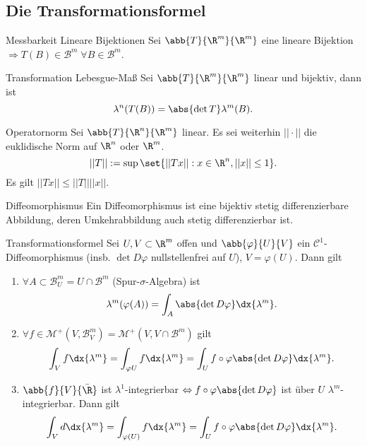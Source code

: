 \subsection*{Die Transformationsformel}

\begin{karte}{Messbarkeit Lineare Bijektionen}
    Sei \( \abb{T}{\R^m}{\R^m} \) eine lineare Bijektion 
    \( \Rightarrow T(B) \in \mathcal{B}^m \;\forall B\in \mathcal{B}^m \).
\end{karte}

\begin{karte}{Transformation Lebesgue-Maß}
    Sei \( \abb{T}{\R^m}{\R^m} \) linear und bijektiv, 
    dann ist 
    \[ \lambda^n(T(B)) = \abs{\det T} \lambda^m(B). \]
\end{karte}

\begin{karte}{Operatornorm}
    Sei \( \abb{T}{\R^n}{\R^m} \) linear. Es sei weiterhin 
    \( ||\cdot|| \) die euklidische Norm auf \(\R^n \) oder \(\R^m\). 
    \[ ||T|| := \sup\set{||Tx||:x\in \R^n, ||x||\leq 1}. \]
    Es gilt 
    \( ||Tx|| \leq ||T|| ||x|| \).
\end{karte}

\begin{karte}{Diffeomorphismus}
    Ein Diffeomorphismus ist eine bijektiv stetig differenzierbare Abbildung, 
    deren Umkehrabbildung auch stetig differenzierbar ist.
\end{karte}

\begin{karte}{Transformationsformel}
    Sei \( U,V\subset \R^m \) offen und \( \abb{\varphi}{U}{V} \) 
    ein \( \mathcal{C}^1 \)-Diffeomorphismus (insb. \( \det D\varphi \) nullstellenfrei auf \(U\)), 
    \(V = \varphi(U)\). Dann gilt 
    \begin{enumerate}
        \item \( \forall A \subset \mathcal{B}_U^m = U \cap \mathcal{B}^m\) (Spur-\(\sigma\)-Algebra) ist 
        \[ \lambda^m(\varphi(A)) = \int_A \abs{\det D\varphi} \dx{\lambda^m}. \]
        \item \( \forall f\in \mathcal{M}^+(V, \mathcal{B}_V^m) 
        = \mathcal{M}^+(V, V \cap \mathcal{B}^m) \) gilt 
        \[ \int_V f \dx{\lambda^m} = \int_{\varphi U} f \dx{\lambda^m} 
        = \int_U f\circ \varphi \abs{\det D\varphi} \dx{\lambda^m}. \]
        \item \( \abb{f}{V}{\bar{\R}} \) ist \( \lambda^1 \)-integrierbar 
        \( \Leftrightarrow f \circ \varphi \abs{\det D\varphi} \) 
        ist über \(U\) \(\lambda^m\)-integrierbar. Dann gilt 
        \[ \int_V d \dx{\lambda^m} = \int_{\varphi(U)} f \dx{\lambda^m} 
        = \int_U f \circ \varphi \abs{\det D\varphi} \dx{\lambda^m}. \]
    \end{enumerate}
\end{karte}

